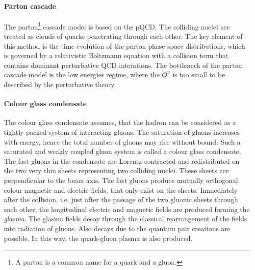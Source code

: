       \paragraph{Parton cascade}
      The parton\footnote{A parton is a common name for a quark and a gluon.} cascade model is based on the pQCD.
      The colliding nuclei are treated as clouds of quarks penetrating through each other.
      The key element of this method is the time evolution of the parton phase-space distributions, which is governed by a relativistic Boltzmann equation with a collision term that contains dominant perturbative QCD interations.
      The bottleneck of the parton cascade model is the low energies regime, where the $Q^2$ is too small to be described by the perturbative theory.
      \paragraph{Colour glass condensate}
      The colour glass condensate assumes, that the hadron can be considered as a tightly packed system of interacting gluons.
      The saturation of gluons increases with energy, hence the total number of gluons may rise without bound.
      Such a saturated and weakly coupled gluon system is called a colour glass condensate.
      The fast gluons in the condensate are Lorentz contracted and redistributed on the two very thin sheets representing two colliding nuclei.
      These sheets are perpendicular to the beam axis.
      The fast gluons produce mutually orthogonal colour magnetic and electric fields, that only exist on the sheets.
      Immediately after the collision, i.e. just after the passage of the two gluonic sheets through each other, the longitudinal electric and magnetic fields are produced forming the \textit{glasma}.
      The glasma fields decay through the classical rearrangement of the fields into radiation of gluons.
      Also decays due to the quantum pair creations are possible.
      In this way, the quark-gluon plasma is also produced.


